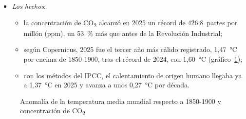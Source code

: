 \documentclass[11pt]{article}
\begin{document}
\begin{itemize}
\item \emph{Los hechos}:
  \begin{itemize}
  \item la concentración de CO\textsubscript{2} alcanzó en 2025 un récord de 426,8~partes por millón (ppm), un 53~\% más que antes de la Revolución Industrial\nocite{OMM2026BoletinGEI22};
  \item según Copernicus, 2025 fue el tercer año más cálido registrado, 1,47~°C por encima de 1850-1900, tras el récord de 2024, con 1,60~°C\nocite{C3S2026GCH2025} (gráfico~\ref{fig:temperatura-co2});
  \item con los métodos del IPCC, el calentamiento de origen humano llegaba ya a 1,37~°C en 2025 y avanza a unos 0,27~°C por década\nocite{Forster2026Indicators}.
  \end{itemize}
\end{itemize}

\begin{figure}[H]
\centering
\caption{Anomalía de la temperatura media mundial respecto a 1850-1900 y concentración de CO\textsubscript{2}}\label{fig:temperatura-co2}
\end{figure}
\end{document}
